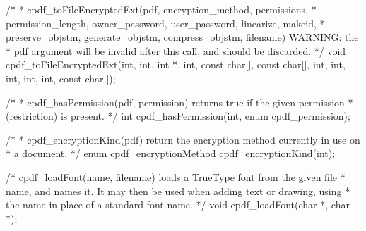 /*
 * cpdf_toFileEncryptedExt(pdf, encryption_method, permissions,
 * permission_length, owner_password, user_password, linearize, makeid,
 * preserve_objstm, generate_objstm, compress_objstm, filename) WARNING: the
 * pdf argument will be invalid after this call, and should be discarded.
 */
void cpdf_toFileEncryptedExt(int, int, int *, int, const char[], const char[],
                             int, int, int, int, int, const char[]);

/*
 * cpdf_hasPermission(pdf, permission) returns true if the given permission
 * (restriction) is present.
 */
int cpdf_hasPermission(int, enum cpdf_permission);

/*
 * cpdf_encryptionKind(pdf) return the encryption method currently in use on
 * a document.
 */
enum cpdf_encryptionMethod cpdf_encryptionKind(int);

/* cpdf_loadFont(name, filename) loads a TrueType font from the given file
 * name, and names it. It may then be used when adding text or drawing, using
 * the name in place of a standard font name. */
void cpdf_loadFont(char *, char *);

